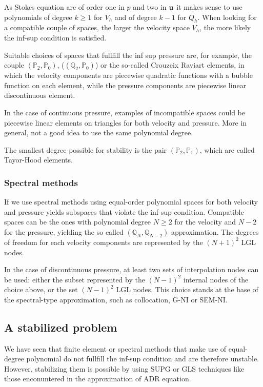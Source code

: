 As Stokes equation are of order one in \(p\) and two in \(\textbf{u}\) it makes sense to use polynomials of degree \(k \geq 1\) for \(V_h\) and of degree \(k-1\) for \(Q_h\).  When looking for a compatible couple of spaces, the larger the velocity space \(V_h\), the more likely the inf-sup condition is satisfied. 

Suitable choices of spaces that fullfill the inf sup pressure are, for example, the couple \((\mathbb{P}_2, \mathbb{P}_0)\), (\((\mathbb{Q}_2, \mathbb{P}_0)\)) or the so-called Crouzeix Raviart elements, in which the velocity components are piecewise quadratic functions with a bubble function on each element, while the pressure components are piecewise linear discontinuous element.

In the case of continuous pressure, examples of incompatible spaces could be piecewise linear elements on triangles for both velocity and pressure. More in general, not a good idea to use the same polynomial degree.

The smallest degree possible for stability is the pair \((\mathbb{P}_2, \mathbb{P}_1)\), which are called Tayor-Hood elements.
\subsubsection*{Spectral methods}
If we use spectral methods using equal-order polynomial spaces for both velocity and pressure yields subspaces that violate the inf-sup condition. Compatible spaces can be the ones with polynomial degree \(N \geq 2\) for the velocity and \(N-2\) for the pressure, yielding the so called \((\mathbb{Q}_N, \mathbb{Q}_{N-2})\) approximation. The degrees of freedom for each velocity components are represented by the \((N+1)^2\) LGL nodes.

In the case of discontinuous pressure, at least two sets of interpolation nodes can be used: either the subset represented by the \((N-1)^2\) internal nodes of the choice above, or the set \((N-1)^2\) LGL nodes. This choice stands at the base of the spectral-type approximation, such as collocation, G-NI or SEM-NI.
\subsection{A stabilized problem}
We have seen that finite element or spectral methods that make use of equal-degree polynomial do not fullfill the inf-sup condition and are therefore unstable. However, stabilizing them is possible by using SUPG or GLS techniques like those enconuntered in the approximation of ADR equation.

